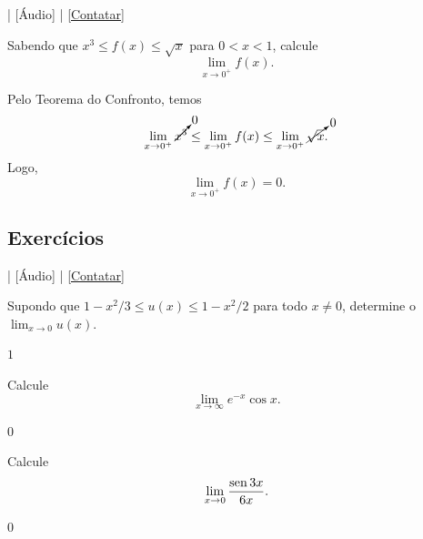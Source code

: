 \begin{flushright}
  [Vídeo] | [Áudio] | \href{https://phkonzen.github.io/notas/contato.html}{[Contatar]}
\end{flushright}

\begin{exeresol}
  Sabendo que $x^3 \leq f(x) \leq \sqrt{x}$ para $0 < x < 1$, calcule
  \begin{equation}
    \lim_{x\to 0^+} f(x).
  \end{equation}
\end{exeresol}
\begin{resol}
  Pelo Teorema do Confronto, temos
  \begin{equation}
    \lim_{x\to 0^+} \cancelto{0}{x^3} \leq \lim_{x\to 0^+} f(x) \leq \lim_{x\to 0^+} \cancelto{0}{\sqrt{x}}.
  \end{equation}
  Logo,
  \begin{equation}
    \lim_{x\to 0^+} f(x) = 0.
  \end{equation}
\end{resol}

\emconstrucao

\subsection*{Exercícios}

\begin{flushright}
  [Vídeo] | [Áudio] | \href{https://phkonzen.github.io/notas/contato.html}{[Contatar]}
\end{flushright}

\begin{exer}
  Supondo que $1-x^2/3 \leq u(x) \leq 1-x^2/2$ para todo $x\neq 0$, determine o $\lim_{x\to 0} u(x)$.
\end{exer}
\begin{resp}
  $1$
\end{resp}

\begin{exer}
  Calcule
  \begin{equation}
    \lim_{x\to \infty} e^{-x}\cos x.
  \end{equation}
\end{exer}
\begin{resp}
  $0$
\end{resp}

\begin{exer}
  Calcule
  \begin{equation}
    \lim_{x\to 0} \frac{\operatorname{sen} 3x}{6x}.
  \end{equation}
\end{exer}
\begin{resp}
  $0$
\end{resp}

